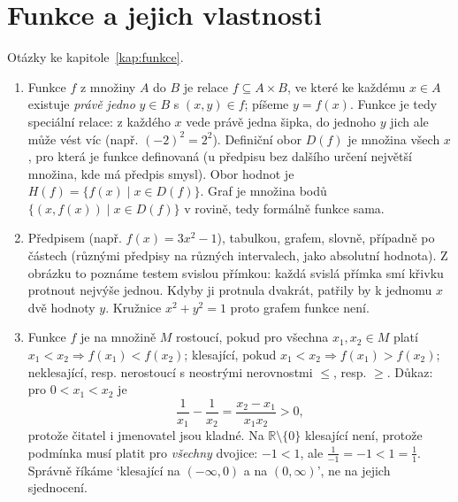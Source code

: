 \section{Funkce a jejich vlastnosti}

Otázky ke kapitole~\ref{kap:funkce}.

\begin{enumerate}[label=\textbf{\arabic*.}, leftmargin=*, itemsep=0.8em]
  \item {}
  Funkce $f$ z množiny $A$ do $B$ je relace $f\subseteq A\times B$, ve které ke každému $x\in A$ existuje \emph{právě jedno} $y\in B$ s $(x, y)\in f$; píšeme $y = f(x)$. Funkce je tedy speciální relace: z každého $x$ vede právě jedna šipka, do jednoho $y$ jich ale může vést víc (např. $(-2)^2 = 2^2$). Definiční obor $D(f)$ je množina všech $x$, pro která je funkce definovaná (u předpisu bez dalšího určení největší množina, kde má předpis smysl). Obor hodnot je $H(f) = \{f(x) \mid x\in D(f)\}$. Graf je množina bodů $\{(x, f(x)) \mid x\in D(f)\}$ v rovině, tedy formálně funkce sama. 

  \item {}
  Předpisem (např. $f(x) = 3x^2 - 1$), tabulkou, grafem, slovně, případně po částech (různými předpisy na různých intervalech, jako absolutní hodnota). Z obrázku to poznáme testem svislou přímkou: každá svislá přímka smí křivku protnout nejvýše jednou. Kdyby ji protnula dvakrát, patřily by k jednomu $x$ dvě hodnoty $y$. Kružnice $x^2 + y^2 = 1$ proto grafem funkce není.

  \item {}
  Funkce $f$ je na množině $M$ rostoucí, pokud pro všechna $x_1, x_2\in M$ platí $x_1 < x_2\Rightarrow f(x_1) < f(x_2)$; klesající, pokud $x_1 < x_2\Rightarrow f(x_1) > f(x_2)$; neklesající, resp. nerostoucí s neostrými nerovnostmi $\leq$, resp. $\geq$. Důkaz: pro $0 < x_1 < x_2$ je
  \begin{equation*}
    \frac{1}{x_1} - \frac{1}{x_2} = \frac{x_2 - x_1}{x_1x_2} > 0,
  \end{equation*}
  protože čitatel i jmenovatel jsou kladné. Na $\mathbb{R}\setminus\{0\}$ klesající není, protože podmínka musí platit pro \emph{všechny} dvojice: $-1 < 1$, ale $\frac{1}{-1} = -1 < 1 = \frac{1}{1}$. Správně říkáme `klesající na $(-\infty, 0)$ a na $(0, \infty)$', ne na jejich sjednocení. 


\end{enumerate}
